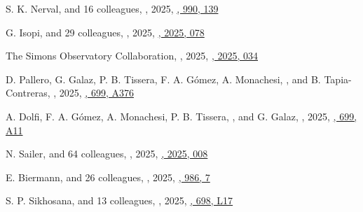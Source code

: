 \begin{etaremune}
\item
S. K. Nerval, and 16 colleagues,
,
2025, \href{https://ui.adsabs.harvard.edu/abs/2025ApJ...990..139N}{\apj, 990, 139}

\item
G. Isopi, and 29 colleagues,
,
2025, \href{https://ui.adsabs.harvard.edu/abs/2025JCAP...08..078I}{\jcap, 2025, 078}

\item
The Simons Observatory Collaboration,
,
2025, \href{https://ui.adsabs.harvard.edu/abs/2025JCAP...08..034A}{\jcap, 2025, 034}

\item
D. Pallero, G. Galaz, P. B. Tissera, F. A. Gómez, A. Monachesi, \myself, and B. Tapia-Contreras,
,
2025, \href{https://ui.adsabs.harvard.edu/abs/2025A&A...699A.376P}{\aap, 699, A376}

\item
A. Dolfi, F. A. Gómez, A. Monachesi, P. B. Tissera, \myself, and G. Galaz,
,
2025, \href{https://ui.adsabs.harvard.edu/abs/2025A&A...699A..11D}{\aap, 699, A11}

\item
N. Sailer, and 64 colleagues,
,
2025, \href{https://ui.adsabs.harvard.edu/abs/2025JCAP...06..008S}{\jcap, 2025, 008}

\item
E. Biermann, and 26 colleagues,
,
2025, \href{https://ui.adsabs.harvard.edu/abs/2025ApJ...986....7B}{\apj, 986, 7}

\item
S. P. Sikhosana, and 13 colleagues,
,
2025, \href{https://ui.adsabs.harvard.edu/abs/2025A&A...698L..17S}{\aap, 698, L17}


\end{etaremune}
